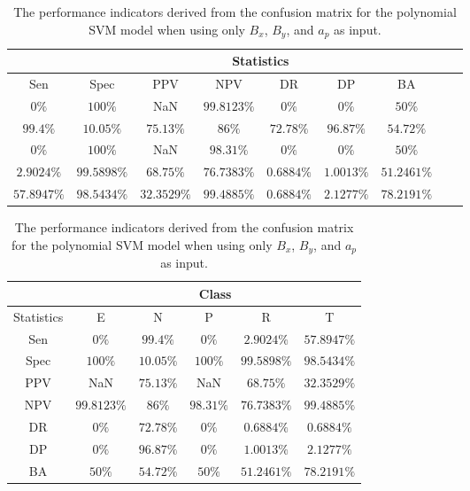 \begin{table}[!ht]
	\centering
	\begin{tabular}{|c|c|c|c|c|c|c|c|c|}
		\hline
		 & \multicolumn{7}{c|}{Statistics} \\ \hline
		Sen & Spec & PPV & NPV & DR & DP & BA \\ \hline
		$0\%$ & $100\%$ & NaN & $99.8123\%$ & $0\%$ & $0\%$ & $50\%$ \\ \hline
		$99.4\%$ & $10.05\%$ & $75.13\%$ & $86\%$ & $72.78\%$ & $96.87\%$ & $54.72\%$ \\ \hline
		$0\%$ & $100\%$ & NaN & $98.31\%$ & $0\%$ & $0\%$ & $50\%$ \\ \hline
		$2.9024\%$ & $99.5898\%$ & $68.75\%$ & $76.7383\%$ & $0.6884\%$ & $1.0013\%$ & $51.2461\%$ \\ \hline
		$57.8947\%$ & $98.5434\%$ & $32.3529\%$ & $99.4885\%$ & $0.6884\%$ & $2.1277\%$ & $78.2191\%$ \\ \hline
	\end{tabular}
	\caption{The performance indicators derived from the confusion matrix for the polynomial SVM model when using only $B_{x}$, $B_{y}$, and $a_{p}$ as input.}
	\label{tab:cs:xyap:svmPoly}
\end{table}

\begin{table}[!ht]
	\centering
	\begin{tabular}{|c|c|c|c|c|c|}
		\hline
		 & \multicolumn{5}{c|}{Class} \\ \hline
		Statistics & E & N & P & R & T \\ \hline
		Sen & $0\%$ & $99.4\%$ & $0\%$ & $2.9024\%$ & $57.8947\%$ \\ \hline
		Spec & $100\%$ & $10.05\%$ & $100\%$ & $99.5898\%$ & $98.5434\%$ \\ \hline
		PPV & NaN & $75.13\%$ & NaN & $68.75\%$ & $32.3529\%$ \\ \hline
		NPV & $99.8123\%$ & $86\%$ & $98.31\%$ & $76.7383\%$ & $99.4885\%$ \\ \hline
		DR & $0\%$ & $72.78\%$ & $0\%$ & $0.6884\%$ & $0.6884\%$ \\ \hline
		DP & $0\%$ & $96.87\%$ & $0\%$ & $1.0013\%$ & $2.1277\%$ \\ \hline
		BA & $50\%$ & $54.72\%$ & $50\%$ & $51.2461\%$ & $78.2191\%$ \\ \hline
	\end{tabular}
	\caption{The performance indicators derived from the confusion matrix for the polynomial SVM model when using only $B_{x}$, $B_{y}$, and $a_{p}$ as input.}
	\label{tab:cs:reverse:xyap:svmPoly}
\end{table}

